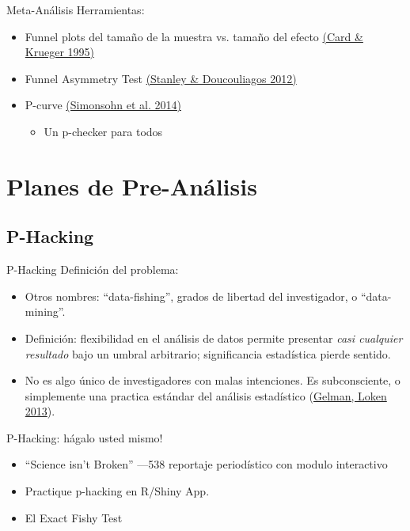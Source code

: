 \documentclass{beamer}
\begin{document}
\begin{frame}{Meta-Análisis}
Herramientas:
\begin{itemize}[<.->]
\item Funnel plots del tamaño de la muestra vs. tamaño del efecto  \href{http://www.jstor.org/stable/2117925}{(Card \& Krueger 1995)}
\item Funnel Asymmetry Test \href{https://books.google.com/books?id=jSQEdEsL7VoC}{(Stanley \& Doucouliagos 2012)}
\item P-curve \href{http://p-curve.com/}{(Simonsohn et al. 2014)} \href{http://p-curve.com/}{}
\begin{itemize}
	\item Un p-checker para todos \href{http://shinyapps.org/apps/p-checker/}{}	
\end{itemize}
\end{itemize}
\end{frame}
\section{Planes de Pre-Análisis}
\subsection*{P-Hacking}
\begin{frame}[<.->]{P-Hacking}
Definición del problema:
\begin{itemize}
\item
Otros nombres: ``data-fishing'', grados de libertad del investigador, o ``data-mining''.
\item
Definición: flexibilidad en el análisis de datos permite presentar \textit{casi cualquier resultado} bajo un umbral arbitrario; significancia estadística pierde sentido.
\item
No es algo único de investigadores con malas intenciones. Es subconsciente, o simplemente una practica estándar del análisis estadístico (\href{http://www.stat.columbia.edu/~gelman/research/unpublished/p_hacking.pdf}{Gelman, Loken 2013}).
\end{itemize}
\end{frame}

\begin{frame}{P-Hacking: hágalo usted mismo!}
\begin{itemize}
\item
``Science isn't Broken'' ---538 reportaje periodístico con modulo interactivo \href{http://fivethirtyeight.com/features/science-isnt-broken}{}
\item 
Practique p-hacking en R/Shiny App. \href{http://www.nicebread.de/introducing-p-hacker/}{}
\item
El Exact Fishy Test \href{https://macartan.shinyapps.io/fish/}{}
\end{itemize}
\end{frame}
\end{document}
